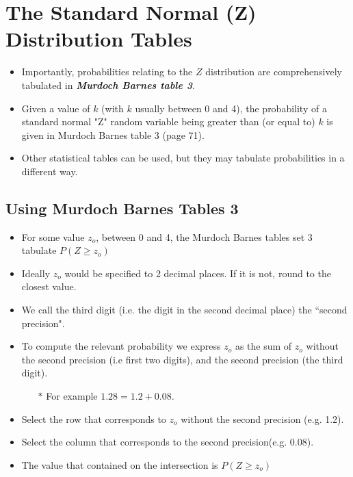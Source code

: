 \documentclass[a4paper,12pt]{article}
\begin{document}
\section*{The Standard Normal (Z) Distribution Tables}
\begin{itemize}


\item Importantly, probabilities relating to the $Z$ distribution are comprehensively tabulated in \textbf{\emph{Murdoch Barnes table 3}}.


\item Given a value of $k$ (with $k$ usually between 0 and 4), the probability of a standard normal "Z" random variable being greater than (or equal to) $k$ is given in Murdoch Barnes table 3 (page 71).

\item Other statistical tables can be used, but they may tabulate probabilities in a different way.
\end{itemize}

\subsection*{Using Murdoch Barnes Tables 3}
\begin{itemize}
\item For some value $z_o$, between 0 and 4, the Murdoch Barnes tables set 3 tabulate $P(Z \geq z_o)$
\item Ideally $z_o$ would be specified to 2 decimal places. If it is not, round to the closest value.
\item We call the third digit (i.e. the digit in the second decimal place) the ``second precision".
\end{itemize}


\begin{itemize}
\item To compute the relevant probability we express $z_o$ as the sum of $z_o$ without the second precision (i.e first two digits), and the second precision (the third digit).
\begin{itemize}
\item[$\ast$] For example $1.28 = 1.2 + 0.08$.
\end{itemize}
\item Select the row that corresponds to $z_o$ without the second precision (e.g. 1.2).
\item Select the column that corresponds to the second precision(e.g. 0.08).
\item The value that contained on the intersection is $P(Z \geq z_o)$
\end{itemize}
\end{document}
